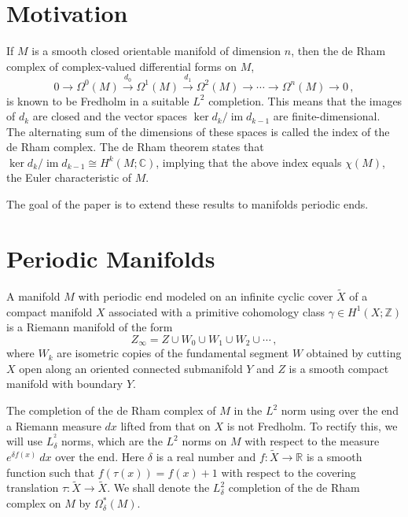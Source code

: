 \documentclass[a4paper, 12pt]{article}
\theoremstyle{definition}
\begin{document}
\section{Motivation}

If \({ M }\) is a smooth closed orientable manifold of dimension \({ n }\), then the de Rham complex of complex-valued differential forms on \({ M }\), \[
    0 \longrightarrow \Omega^{0}(M) \overset{d_0}{\longrightarrow} \Omega^{1}(M) \overset{d_1}{\longrightarrow} \Omega^2(M) \longrightarrow \cdots \longrightarrow \Omega^{n}(M) \longrightarrow 0\,,
\] is known to be Fredholm in a suitable \({ L^{2} }\) completion. This means that the images of \({ d_{k} }\) are closed and the vector spaces \({ \ker d_{k} / \operatorname{im} d_{k-1} }\) are finite-dimensional. The alternating sum of the dimensions of these spaces is called the index of the de Rham complex. The de Rham theorem states that \({ \ker d_{k} / \operatorname{im} d_{k-1} \cong H^{k}(M; \mathbb C) }\), implying that the above index equals \({ \chi(M) }\), the Euler characteristic of \({ M }\).

The goal of the paper is to extend these results to manifolds periodic ends.

\section{Periodic Manifolds}

A manifold \({ M }\) with periodic end modeled on an infinite cyclic cover \({ \tilde X }\) of a compact manifold \({ X }\) associated with a primitive cohomology class \({ \gamma \in H^{1}(X;\mathbb Z) }\) is a Riemann manifold of the form \[
    Z_{\infty} = Z \cup W_0 \cup W_1 \cup W_2 \cup \cdots\,,
\] where \({ W_{k} }\) are isometric copies of the fundamental segment \({ W }\) obtained by cutting \({ X }\) open along an oriented connected submanifold \({ Y }\) and \({ Z }\) is a smooth compact manifold with boundary \({ Y }\). 

The completion of the de Rham complex of \({ M }\) in the \({ L^{2} }\) norm using over the end a Riemann measure \({ dx }\) lifted from that on \({ X }\) is not Fredholm. To rectify this, we will use \({ L_{\delta}^{^2} }\) norms, which are the \({ L^{2} }\) norms on \({ M }\) with respect to the measure \({ e^{\delta f(x)}\: dx }\) over the end. Here \({ \delta }\) is a real number and \({ f : \tilde X \to \mathbb R }\) is a smooth function such that \({ f(\tau(x)) = f(x) + 1 }\) with respect to the covering translation \({ \tau : \tilde X \to \tilde X }\). We shall denote the \({ L_{\delta}^2 }\) completion of the de Rham complex on \({ M }\) by \({ \Omega_{\delta}^*(M) }\).
\end{document}

